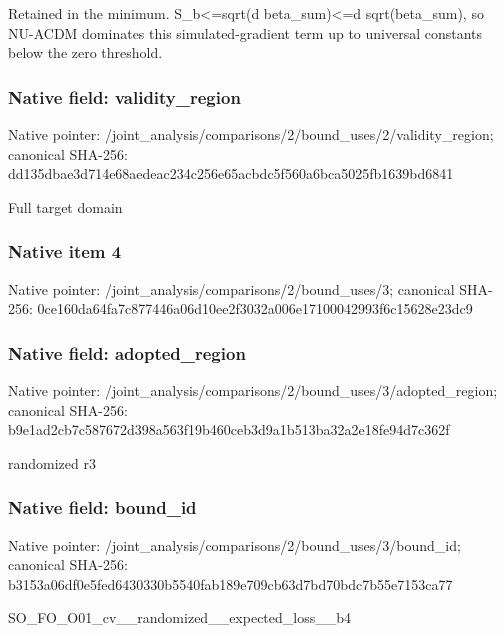 \documentclass[10pt,a4paper]{article}
\begin{document}
\begingroup\raggedright\sloppy Retained in the minimum. S\_\allowbreak{}b<=\allowbreak{}sqrt(d beta\_\allowbreak{}sum)<=\allowbreak{}d sqrt(beta\_\allowbreak{}sum),\allowbreak{} so NU-ACDM dominates this simulated-gradient term up to universal constants below the zero threshold.\par\endgroup

\subsubsection{Native field: validity\_\allowbreak{}region}
Native pointer: /joint\_\allowbreak{}analysis/comparisons/2/bound\_\allowbreak{}uses/2/validity\_\allowbreak{}region; canonical SHA-256: dd135dbae3d714e68aedeac234c256e65acbdc5f560a6bca5025fb1639bd6841

\begingroup\raggedright\sloppy Full target domain\par\endgroup

\subsubsection{Native item 4}
Native pointer: /joint\_\allowbreak{}analysis/comparisons/2/bound\_\allowbreak{}uses/3; canonical SHA-256: 0ce160da64fa7c877446a06d10ee2f3032a006e17100042993f6c15628e23dc9

\subsubsection{Native field: adopted\_\allowbreak{}region}
Native pointer: /joint\_\allowbreak{}analysis/comparisons/2/bound\_\allowbreak{}uses/3/adopted\_\allowbreak{}region; canonical SHA-256: b9e1ad2cb7c587672d398a563f19b460ceb3d9a1b513ba32a2e18fe94d7c362f

\begingroup\raggedright\sloppy randomized r3\par\endgroup

\subsubsection{Native field: bound\_\allowbreak{}id}
Native pointer: /joint\_\allowbreak{}analysis/comparisons/2/bound\_\allowbreak{}uses/3/bound\_\allowbreak{}id; canonical SHA-256: b3153a06df0e5fed6430330b5540fab189e709cb63d7bd70bdc7b55e7153ca77

\begingroup\raggedright\sloppy SO\_\allowbreak{}FO\_\allowbreak{}O01\_\allowbreak{}cv\_\allowbreak{}\_\allowbreak{}randomized\_\allowbreak{}\_\allowbreak{}expected\_\allowbreak{}loss\_\allowbreak{}\_\allowbreak{}b4\par\endgroup
\end{document}
